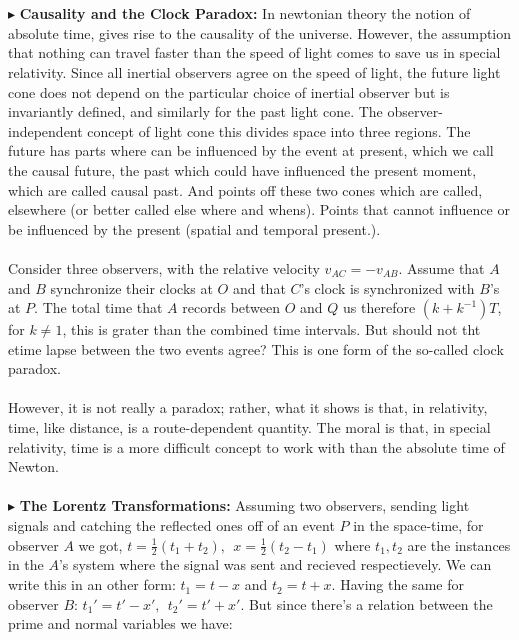 \documentclass[10pt,a4paper,twocolumn]{article}
\newcounter{theo}
\newcounter{def}
\newcommand{\newpoint}[1]{\indent$\blacktriangleright$ \textbf{#1}}
\begin{document}
                \\
                \\
                \newpoint{Causality and the Clock Paradox: } In newtonian theory the notion of absolute time, gives rise to the causality of the universe. However, the assumption that nothing can travel faster than the speed of light comes to save us in special relativity. Since all inertial observers agree on the speed of light, the future light cone does not depend on the particular choice of inertial observer but is invariantly defined, and similarly for the past light cone. The observer-independent concept of light cone this divides space into three regions. The future has parts where can be influenced by the event at present, which we call the causal future, the past which could have influenced the present moment, which are called causal past. And points off these two cones which are called, elsewhere (or better called else where and whens). Points that cannot influence or be influenced by the present (spatial and temporal present.).
                \\
                \\
                Consider three observers, with the relative velocity $v_{AC} =-v_{AB}$. Assume that $A$ and $B$ synchronize their clocks at $O$ and that $C$'s clock is synchronized with $B$'s at $P$. The total time that $A$ records between $O$ and $Q$ us therefore $(k+k^{-1})T$, for $k\not= 1$, this is grater than the combined time intervals. But should not tht etime lapse between the two events agree? This is one form of the so-called clock paradox.
                \\
                \\
                However, it is not really a paradox; rather, what it shows is that, in relativity, time, like distance, is a route-dependent quantity. The moral is that, in special relativity, time is a more difficult concept to work with than the absolute time of Newton.
                \\
                \\
                \newpoint{The Lorentz Transformations:} Assuming two observers, sending light signals and catching the reflected ones off of an event $P$ in the space-time, for observer $A$ we got, $t = \frac12(t_1+t_2), \ \ x=\frac12(t_2-t_1)$ where $t_1, t_2$ are the instances in the $A$'s system where the signal was sent and recieved respectievely. We can write this in an other form: $t_1 = t-x$ and $t_2 = t+x$. Having the same for observer $B$: $t_1' = t'-x',  \ \ t_2' = t'+x'$. But since there's a relation between the prime and normal variables we have:
\end{document}
